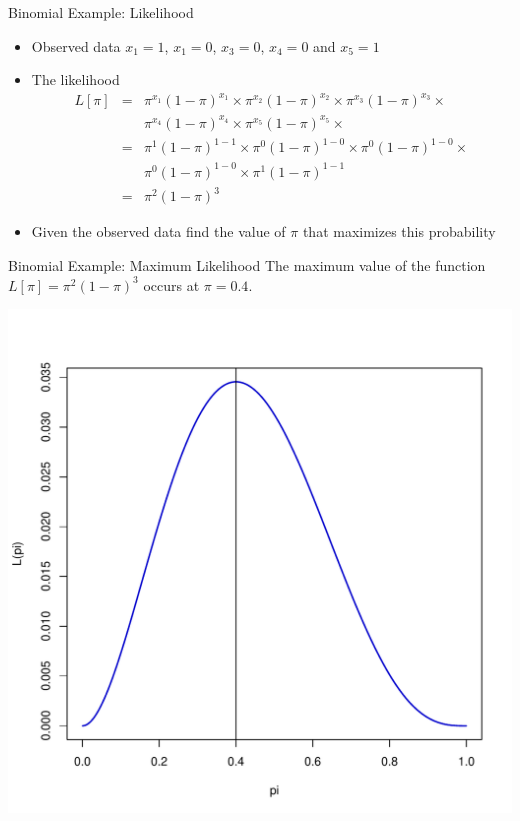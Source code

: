 \documentclass[xcolor=x11names,compress]{beamer}\usepackage[]{graphicx}\usepackage[]{color}
\newenvironment{knitrout}{}{} %
\begin{document}
\begin{frame}[fragile]{Binomial Example: Likelihood}
  \begin{itemize}
\item Observed data 
  $x_1=1$, $x_1=0$,
  $x_3=0$, $x_4=0$ and
  $x_5=1$
  \item The likelihood
\begin{eqnarray*}
  L[\pi] & = & 
  \pi^{x_1} (1-\pi)^{x_1} \times 
    \pi^{x_2} (1-\pi)^{x_2} \times 
      \pi^{x_3} (1-\pi)^{x_3} \times
    \\ 
    & &
        \pi^{x_4} (1-\pi)^{x_4} \times 
          \pi^{x_5} (1-\pi)^{x_5} \times\\
          & = &
  \pi^{1} (1-\pi)^{1-1}\times
   \pi^{0} (1-\pi)^{1-0}\times
    \pi^{0} (1-\pi)^{1-0}\times
     \\ 
    & &
     \pi^{0} (1-\pi)^{1-0}\times
      \pi^{1} (1-\pi)^{1-1}\\
      & = &
      \pi^{2} (1-\pi)^{3}
\end{eqnarray*}
\item Given the observed data find the value of $\pi$ that maximizes this
  probability
\end{itemize}
\end{frame}


\begin{frame}[fragile]{Binomial Example: Maximum Likelihood}
  The maximum value of the function $L[\pi]=\pi^{2} (1-\pi)^{3}$ occurs at $\pi=0.4$.
\begin{knitrout}\tiny
{}\color{fgcolor}

{\centering \includegraphics[width=.6\linewidth]{figure/beamer-unnamed-chunk-88-1} 

}



\end{knitrout}
\end{frame}
\end{document}
